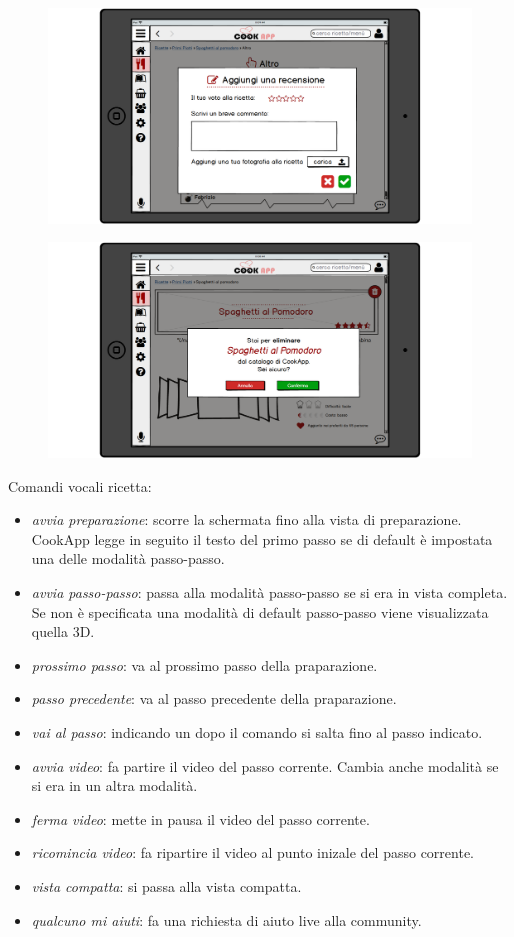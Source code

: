 \begin{figure}[H]
	\centering
	\includegraphics[width=0.95\linewidth]{img/mockup/Ricetta7.png}
\end{figure}
\begin{figure}[H]
	\centering
	\includegraphics[width=0.95\linewidth]{img/mockup/Ricetta-remove.png}
\end{figure}

Comandi vocali ricetta: 
\begin{itemize}
\item \emph{avvia preparazione}: scorre la schermata fino alla vista di
preparazione. CookApp legge in seguito il testo del primo passo se di
default è impostata una delle modalità passo-passo.
\item \emph{avvia passo-passo}: passa alla modalità passo-passo se si
era in vista completa. Se non è specificata una modalità di default
passo-passo viene visualizzata quella 3D.
\item \emph{prossimo passo}: va al prossimo passo della praparazione.
\item \emph{passo precedente}: va al passo precedente della praparazione.
\item \emph{vai al passo}: indicando un dopo il comando
si salta fino al passo indicato.
\item \emph{avvia video}: fa partire il video del passo corrente. Cambia
anche modalità se si era in un altra modalità.
\item \emph{ferma video}: mette in pausa il video del passo corrente.
\item \emph{ricomincia video}: fa ripartire il video al punto inizale
del passo corrente.
\item \emph{vista compatta}: si passa alla vista compatta.
\item \emph{qualcuno mi aiuti}: fa una richiesta di aiuto live alla
community.
\end{itemize}

